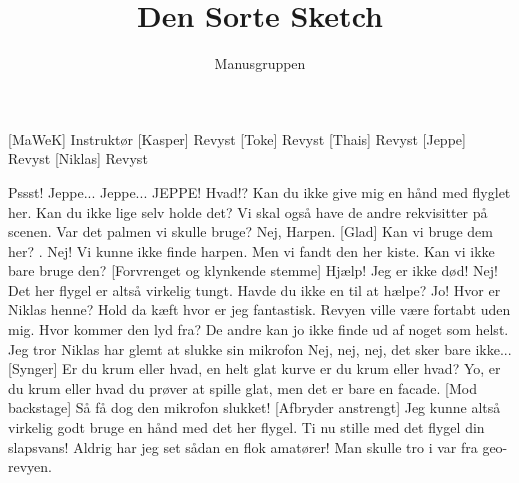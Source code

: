\documentclass[a4paper,11pt]{article}
\title{Den Sorte Sketch}
\author{Manusgruppen}
\begin{document}
\maketitle

\begin{roles}
[MaWeK] Instruktør
[Kasper] Revyst
[Toke] Revyst
[Thais] Revyst
[Jeppe] Revyst
[Niklas] Revyst
\end{roles}

\begin{sketch}
 Pssst! Jeppe... Jeppe...  JEPPE!
 Hvad!?
 Kan du ikke give mig en hånd med flyglet her.
 Kan du ikke lige selv holde det? Vi skal også have de andre rekvisitter på scenen. 
 Var det palmen vi skulle bruge?
 Nej, Harpen.
[Glad]  Kan vi bruge dem her? . 
 Nej!
 Vi kunne ikke finde harpen.
 Men vi fandt den her kiste. Kan vi ikke bare bruge den?
[Forvrenget og klynkende stemme] Hjælp! Jeg er ikke død!
 Nej!
 Det her flygel er altså virkelig tungt.
 Havde du ikke en til at hælpe?
 Jo! Hvor er Niklas henne?
 Hold da kæft hvor er jeg fantastisk. Revyen ville være fortabt uden mig. 
 Hvor kommer den lyd fra?
 De andre kan jo ikke finde ud af noget som helst.
 Jeg tror Niklas har glemt at slukke sin mikrofon
 Nej, nej, nej, det sker bare ikke...
[Synger] Er du krum eller hvad, en helt glat kurve er du krum eller hvad? Yo, er du krum eller hvad du prøver at spille glat, men det er bare en facade.
[Mod backstage] Så få dog den mikrofon slukket!
[Afbryder anstrengt] Jeg kunne altså virkelig godt bruge en hånd med det her flygel.
 Ti nu stille med det flygel din slapsvans! Aldrig har jeg set sådan en flok amatører! Man skulle tro i var fra geo-revyen. 

\end{sketch}
\end{document}
